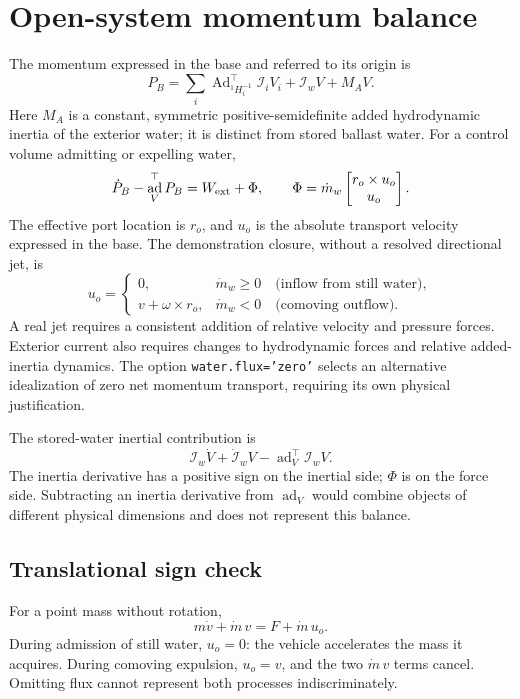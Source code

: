 \documentclass[11pt,a4paper]{article}
\DeclareMathOperator{\Ad}{Ad}\DeclareMathOperator{\ad}{ad}\DeclareMathOperator{\diag}{diag}
\begin{document}
\section{Open-system momentum balance}
The momentum expressed in the base and referred to its origin is
\begin{equation}
P_B=\sum_i\Ad_{{}^{1}H_i^{-1}}^\top\mathcal I_iV_i+\mathcal I_wV+M_AV.
\end{equation}
Here \(M_A\) is a constant, symmetric positive-semidefinite added
hydrodynamic inertia of the exterior water; it is distinct from stored
ballast water. For a control volume admitting or expelling water,
\begin{equation}
\dot P_B-\ad_V^\top P_B=W_{\rm ext}+\Phi,\qquad
\Phi=\dot m_w\begin{bmatrix}r_o\times u_o\\u_o\end{bmatrix}.\label{eq:flux}
\end{equation}
The effective port location is \(r_o\), and \(u_o\) is the absolute
transport velocity expressed in the base. The demonstration closure,
without a resolved directional jet, is
\begin{equation}
u_o=\begin{cases}0,&\dot m_w\geq0\quad\text{(inflow from still water)},\\
v+\omega\times r_o,&\dot m_w<0\quad\text{(comoving outflow)}.\end{cases}
\end{equation}
A real jet requires a consistent addition of relative velocity and
pressure forces. Exterior current also requires changes to hydrodynamic
forces and relative added-inertia dynamics. The option
\texttt{water.flux='zero'} selects an alternative idealization of zero
net momentum transport, requiring its own physical justification.

The stored-water inertial contribution is
\begin{equation}
\boxed{\mathcal I_w\dot V+\dot{\mathcal I}_wV-\ad_V^\top\mathcal I_wV.}
\label{eq:waterbalance}
\end{equation}
The inertia derivative has a positive sign on the inertial side;
\(\Phi\) is on the force side. Subtracting an inertia derivative from
\(\ad_V\) would combine objects of different physical dimensions and
does not represent this balance.

\subsection{Translational sign check}
For a point mass without rotation,
\begin{equation}
m\dot v+\dot m\,v=F+\dot m\,u_o.
\end{equation}
During admission of still water, \(u_o=0\): the vehicle accelerates
the mass it acquires. During comoving expulsion, \(u_o=v\), and the
two \(\dot m\,v\) terms cancel. Omitting flux cannot represent both
processes indiscriminately.
\end{document}
